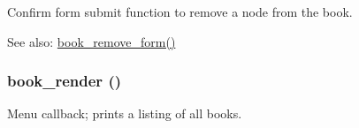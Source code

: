 Confirm form submit function to remove a node from the book.

\begin{Desc}
\item[See also:]\hyperlink{group__forms_g4cd634d95539957d72f2efbe228769f7}{book\_\-remove\_\-form()} \end{Desc}
\hypertarget{book_8pages_8inc_b9a467483a4cc1909dc16838d6760eea}{
\subsubsection[{book\_\-render}]{\setlength{\rightskip}{0pt plus 5cm}book\_\-render ()}}
\label{book_8pages_8inc_b9a467483a4cc1909dc16838d6760eea}


Menu callback; prints a listing of all books. 